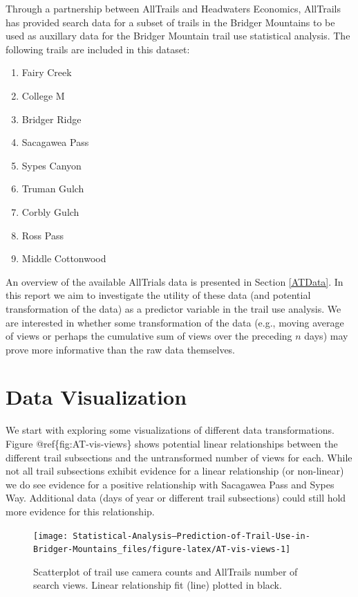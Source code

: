 \documentclass[
]{book}
\providecommand{\tightlist}{%
  \setlength{\itemsep}{0pt}\setlength{\parskip}{0pt}}
\begin{document}
Through a partnership between AllTrails and Headwaters Economics, AllTrails has provided search data for a subset of trails in the Bridger Mountains to be used as auxillary data for the Bridger Mountain trail use statistical analysis. The following trails are included in this dataset:

\begin{enumerate}
\def\labelenumi{\arabic{enumi}.}
\tightlist
\item
  Fairy Creek
\item
  College M
\item
  Bridger Ridge
\item
  Sacagawea Pass
\item
  Sypes Canyon
\item
  Truman Gulch
\item
  Corbly Gulch
\item
  Ross Pass
\item
  Middle Cottonwood
\end{enumerate}

An overview of the available AllTrials data is presented in Section \ref{ATData}. In this report we aim to investigate the utility of these data (and potential transformation of the data) as a predictor variable in the trail use analysis. We are interested in whether some transformation of the data (e.g., moving average of views or perhaps the cumulative sum of views over the preceding \(n\) days) may prove more informative than the raw data themselves.

\hypertarget{data-visualization}{%
\section{Data Visualization}\label{data-visualization}}

We start with exploring some visualizations of different data transformations. Figure @ref\{fig:AT-vis-views\} shows potential linear relationships between the different trail subsections and the untransformed number of views for each. While not all trail subsections exhibit evidence for a linear relationship (or non-linear) we do see evidence for a positive relationship with Sacagawea Pass and Sypes Way. Additional data (days of year or different trail subsections) could still hold more evidence for this relationship.

\begin{figure}

{\centering \texttt{[image: Statistical-Analysis--Prediction-of-Trail-Use-in-Bridger-Mountains\_files/figure-latex/AT-vis-views-1]} 

}

\caption{Scatterplot of trail use camera counts and AllTrails number of search views. Linear relationship fit (line) plotted in black.}\label{fig:AT-vis-views}
\end{figure}
\end{document}
